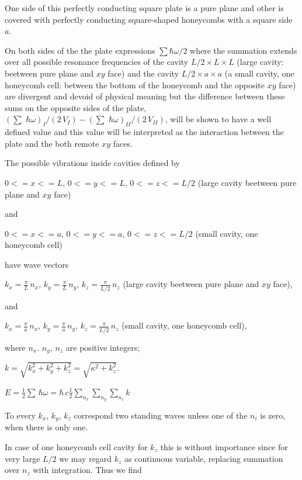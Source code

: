 \documentclass[11pt]{article}
\begin{document}
One side of this perfectly conducting square plate is a pure plane and
other is covered with perfectly conducting square-shaped honeycombs with
a square side \(a\).

On both sides of the the plate expressions \(\sum\hbar\omega\big/2\)
where the summation extends over all possible resonance frequencies of
the cavity \(L/2 \times L \times L\) (large cavity: beetween pure plane
and \(xy\) face) and the cavity \(L/2 \times a\times a\) (a small
cavity, one honeycomb cell: between the bottom of the honeycomb and the
opposite \(xy\) face) are divergent and devoid of physical meaning but
the difference between these sums on the opposite sides of the plate,
\(\left(\sum\,\,\hbar\omega\right)_{I}\big/{\left(2\,V_{I}\right)} - \left(\sum\,\,\hbar\omega\right)_{II}\big/{\left(2\,V_{II}\right)}\),
will be shown to have a well defined value and this value will be
interpreted as the interaction between the plate and the both remote
\(xy\) faces.

    The possible vibrations inside cavities defined by

    \(0<=x<=L\), \(0<=y<=L\), \(0<=z<=L/2\) (large cavity beetween pure
plane and \(xy\) face)

    and

    \(0<=x<=a\), \(0<=y<=a\), \(0<=z<=L/2\) (small cavity, one honeycomb
cell)

    have wave vectors

    \(k_x = \frac{\pi}{L}\,n_x\), \(k_y = \frac{\pi}{L}\,n_y\),
\(k_z = \frac{\pi}{L/2}\,n_z\) (large cavity beetween pure plane and
\(xy\) face),

    and

    \(k_x = \frac{\pi}{a}\,n_x\), \(k_y = \frac{\pi}{a}\,n_y\),
\(k_z = \frac{\pi}{L/2}\,n_z\) (small cavity, one honeycomb cell),

where \(n_x\). \(n_y\), \(n_z\) are positive integers;

    \(k = \sqrt{k_x^2+k_y^2+k_z^2} = \sqrt{\kappa^2+k_z^2}\).

    \(E = \frac{1}{2}\sum\,\hbar\omega = \hbar\,c\frac{1}{2}\sum\limits_{n_x}^{}\sum\limits_{n_y}^{}\sum\limits_{n_z}^{}k\)

    To every \(k_x\), \(k_y\), \(k_z\) correspond two standing waves unless
one of the \(n_i\) is zero, when there is only one.

    In case of one honeycomb cell cavity for \(k_z\) this is without
importance since for very large \(L/2\) we may regard \(k_z\) as
continuous variable, replacing summation over \(n_z\) with integration.
Thus we find
\end{document}
